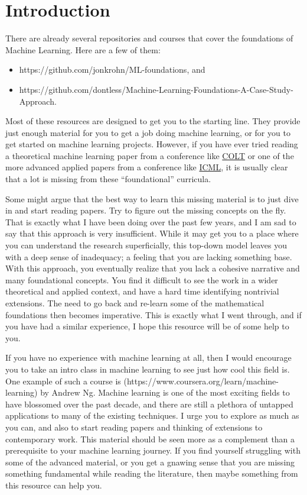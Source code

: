 \hypertarget{introduction}{%
\section{Introduction}\label{introduction}}

There are already several repositories and courses that cover the
foundations of Machine Learning. Here are a few of them:

\begin{itemize}
\tightlist
\item
  https://github.com/jonkrohn/ML-foundations, and
\item
  https://github.com/dontless/Machine-Learning-Foundations-A-Case-Study-Approach.
\end{itemize}

Most of these resources are designed to get you to the starting line.
They provide just enough material for you to get a job doing machine
learning, or for you to get started on machine learning projects.
However, if you have ever tried reading a theoretical machine learning
paper from a conference like
\href{http://www.learningtheory.org/colt2021/accepted.html}{COLT} or one
of the more advanced applied papers from a conference like
\href{https://icml.cc/Conferences/2021/Schedule?type=Poster}{ICML}, it
is usually clear that a lot is missing from these ``foundational''
curricula.

Some might argue that the best way to learn this missing material is to
just dive in and start reading papers. Try to figure out the missing
concepts on the fly. That is exactly what I have been doing over the
past few years, and I am sad to say that this approach is very
insufficient. While it may get you to a place where you can understand
the research superficially, this top-down model leaves you with a deep
sense of inadequacy; a feeling that you are lacking something base. With
this approach, you eventually realize that you lack a cohesive narrative
and many foundational concepts. You find it difficult to see the work in
a wider theoretical and applied context, and have a hard time
identifying nontrivial extensions. The need to go back and re-learn some
of the mathematical foundations then becomes imperative. This is exactly
what I went through, and if you have had a similar experience, I hope
this resource will be of some help to you.

If you have no experience with machine learning at all, then I would
encourage you to take an intro class in machine learning to see just how
cool this field is. One example of such a course is
(https://www.coursera.org/learn/machine-learning) by Andrew Ng. Machine
learning is one of the most exciting fields to have blossomed over the
past decade, and there are still a plethora of untapped applications to
many of the existing techniques. I urge you to explore as much as you
can, and also to start reading papers and thinking of extensions to
contemporary work. This material should be seen more as a complement
than a prerequisite to your machine learning journey. If you find
yourself struggling with some of the advanced material, or you get a
gnawing sense that you are missing something fundamental while reading
the literature, then maybe something from this resource can help you.

